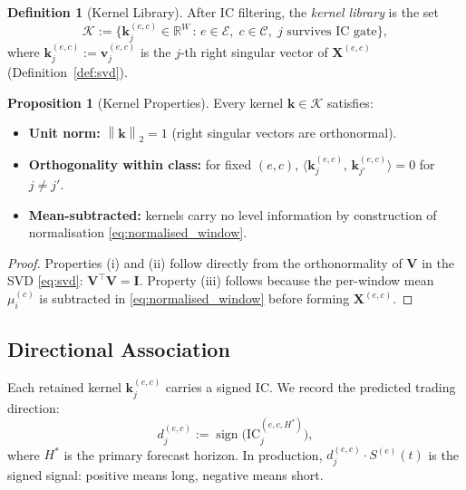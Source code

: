 \documentclass[11pt,a4paper]{article}
\theoremstyle{definition}
\newtheorem{definition}{Definition}[section]
\newtheorem{proposition}{Proposition}[section]
\theoremstyle{plain}
\newcommand{\R}{\mathbb{R}}
\newcommand{\Xmat}{\mathbf{X}}
\newcommand{\Vmat}{\mathbf{V}}
\newcommand{\bvec}[1]{\mathbf{#1}}
\newcommand{\norm}[1]{\left\lVert #1 \right\rVert}
\newcommand{\inner}[2]{\langle #1,\, #2 \rangle}
\begin{document}
\begin{definition}[Kernel Library]
\label{def:kernel_library}
After IC filtering, the \emph{kernel library} is the set
\begin{equation}
    \mathcal{K} :=
    \bigl\{\bvec{k}^{(e,c)}_j \in \R^W \,:\,
    e \in \mathcal{E},\; c \in \mathcal{C},\; j \text{ survives IC gate}\bigr\},
    \label{eq:kernel_library}
\end{equation}
where $\bvec{k}^{(e,c)}_j := \bvec{v}^{(e,c)}_j$ is the $j$-th right singular vector
of $\Xmat^{(e,c)}$ (Definition~\ref{def:svd}).
\end{definition}

\begin{proposition}[Kernel Properties]
\label{prop:kernel_properties}
Every kernel $\bvec{k} \in \mathcal{K}$ satisfies:
\begin{itemize}
    \item[(i)] \textbf{Unit norm:} $\norm{\bvec{k}}_2 = 1$ (right singular vectors are
               orthonormal).
    \item[(ii)] \textbf{Orthogonality within class:} for fixed $(e, c)$, $\inner{
                \bvec{k}^{(e,c)}_j}{\bvec{k}^{(e,c)}_{j'}} = 0$ for $j \neq j'$.
    \item[(iii)] \textbf{Mean-subtracted:} kernels carry no level information by
                 construction of normalisation \eqref{eq:normalised_window}.
\end{itemize}
\end{proposition}

\begin{proof}
Properties (i) and (ii) follow directly from the orthonormality of $\Vmat$ in the SVD
\eqref{eq:svd}: $\Vmat^\top \Vmat = \mathbf{I}$. Property (iii) follows because the
per-window mean $\mu^{(c)}_i$ is subtracted in \eqref{eq:normalised_window} before
forming $\Xmat^{(e,c)}$.
\end{proof}

\subsection{Directional Association}

Each retained kernel $\bvec{k}^{(e,c)}_j$ carries a signed IC. We record the predicted
trading direction:
\begin{equation}
    d^{(e,c)}_j := \operatorname{sign}\!\bigl(\mathrm{IC}_j^{(e,c,H^*)}\bigr),
    \label{eq:direction}
\end{equation}
where $H^*$ is the primary forecast horizon. In production, $d^{(e,c)}_j \cdot S^{(e)}(t)$
is the signed signal: positive means long, negative means short.
\end{document}
